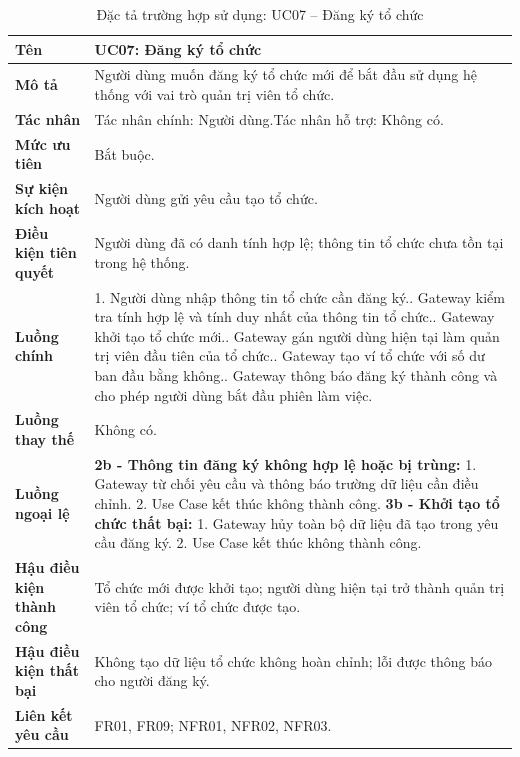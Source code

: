 \begin{longtable}{|L{4.2cm}|L{9.5cm}|}
\caption[Đặc tả UC07]{Đặc tả trường hợp sử dụng: UC07 -- Đăng ký tổ chức} \\\hline
\textbf{Tên} & UC07: Đăng ký tổ chức \\\hline
\textbf{Mô tả} & Người dùng muốn đăng ký tổ chức mới để bắt đầu sử dụng hệ thống với vai trò quản trị viên tổ chức.\\\hline
\textbf{Tác nhân} & Tác nhân chính: Người dùng.\newline Tác nhân hỗ trợ: Không có.\\\hline
\textbf{Mức ưu tiên} & Bắt buộc.\\\hline
\textbf{Sự kiện kích hoạt} & Người dùng gửi yêu cầu tạo tổ chức.\\\hline
\textbf{Điều kiện tiên quyết} & Người dùng đã có danh tính hợp lệ; thông tin tổ chức chưa tồn tại trong hệ thống.\\\hline
\textbf{Luồng chính} &
1. Người dùng nhập thông tin tổ chức cần đăng ký.. Gateway kiểm tra tính hợp lệ và tính duy nhất của thông tin tổ chức.. Gateway khởi tạo tổ chức mới.. Gateway gán người dùng hiện tại làm quản trị viên đầu tiên của tổ chức.. Gateway tạo ví tổ chức với số dư ban đầu bằng không.. Gateway thông báo đăng ký thành công và cho phép người dùng bắt đầu phiên làm việc.\\\hline
\textbf{Luồng thay thế} &
Không có.\\\hline
\textbf{Luồng ngoại lệ} &
\textbf{2b - Thông tin đăng ký không hợp lệ hoặc bị trùng:} 1. Gateway từ chối yêu cầu và thông báo trường dữ liệu cần điều chỉnh. 2. Use Case kết thúc không thành công.\newline
\textbf{3b - Khởi tạo tổ chức thất bại:} 1. Gateway hủy toàn bộ dữ liệu đã tạo trong yêu cầu đăng ký. 2. Use Case kết thúc không thành công.\\\hline
\textbf{Hậu điều kiện thành công} & Tổ chức mới được khởi tạo; người dùng hiện tại trở thành quản trị viên tổ chức; ví tổ chức được tạo.\\\hline
\textbf{Hậu điều kiện thất bại} & Không tạo dữ liệu tổ chức không hoàn chỉnh; lỗi được thông báo cho người đăng ký.\\\hline
\textbf{Liên kết yêu cầu} & FR01, FR09; NFR01, NFR02, NFR03.\\\hline
\end{longtable}



